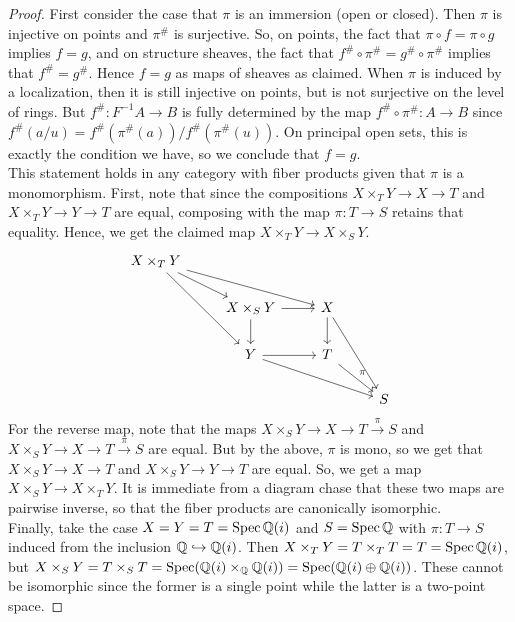 \begin{proof}
	First consider the case that $\pi$ is an immersion (open or closed). Then $\pi$ is injective on points and $\pi^\#$ is surjective. So, on points, the fact that $\pi \circ f = \pi \circ g$ implies $f = g$, and on structure sheaves, the fact that $f^\# \circ \pi^\# = g^\# \circ \pi^\#$ implies that $f^\# = g^\#$. Hence $f = g$ as maps of sheaves as claimed. When $\pi$ is induced by a localization, then it is still injective on points, but is not surjective on the level of rings. But $f^\# : F^{-1}A \to B$ is fully determined by the map $f^\# \circ \pi^\# : A \to B$ since $f^\#(a/u) = f^\#(\pi^\#(a))/f^\#(\pi^\#(u))$. On principal open sets, this is exactly the condition we have, so we conclude that $f = g$. \\
	
	This statement holds in any category with fiber products given that $\pi$ is a monomorphism. First, note that since the compositions $X \times_T Y \to X \to T$ and $X \times_T Y \to Y \to T$ are equal, composing with the map $\pi : T \to S$ retains that equality. Hence, we get the claimed map $X \times_T Y \to X \times_S Y$.
	\[ \begin{tikzcd} X \times_T Y \arrow[rd] \arrow[rrd] \arrow[rdd] \\ & X \times_S Y \arrow[r] \arrow[d] & X \arrow[d] \arrow[ddr] \\ & Y \arrow[r] \arrow[rrd] & T \arrow[rd, "\pi"] \\ & & & S \end{tikzcd} \]
	For the reverse map, note that the maps $X \times_S Y \to X \to T \xrightarrow{\pi} S$ and $X \times_S Y \to X \to T \xrightarrow{\pi} S$ are equal. But by the above, $\pi$ is mono, so we get that $X \times_S Y \to X \to T$ and $X \times_S Y \to Y \to T$ are equal. So, we get a map $X \times_S Y \to X \times_T Y$. It is immediate from a diagram chase that these two maps are pairwise inverse, so that the fiber products are canonically isomorphic. \\
	
	Finally, take the case $X = Y = T = \operatorname{Spec} \mathbb{Q}(i)$ and $S = \operatorname{Spec} \mathbb{Q}$ with $\pi : T \to S$ induced from the inclusion $\mathbb{Q} \hookrightarrow \mathbb{Q}(i)$. Then $X \times_T Y = T \times_T T = T = \operatorname{Spec} \mathbb{Q}(i)$, but $X \times_S Y = T \times_S T = \operatorname{Spec}(\mathbb{Q}(i) \times_{\mathbb{Q}} \mathbb{Q}(i)) = \operatorname{Spec}(\mathbb{Q}(i) \oplus \mathbb{Q}(i))$. These cannot be isomorphic since the former is a single point while the latter is a two-point space.
\end{proof}
